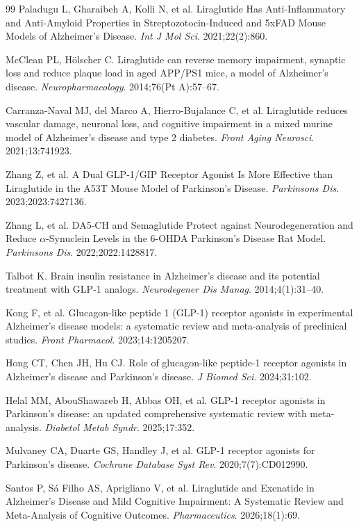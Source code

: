 \documentclass[11pt, a4paper]{article}
\begin{document}
\begin{thebibliography}{99}
 Paladugu L, Gharaibeh A, Kolli N, et al. Liraglutide
Has Anti-Inflammatory and Anti-Amyloid Properties in Streptozotocin-Induced
and 5xFAD Mouse Models of Alzheimer's Disease. \textit{Int J Mol Sci}.
2021;22(2):860.

 McClean PL, H\"olscher C. Liraglutide can reverse
memory impairment, synaptic loss and reduce plaque load in aged APP/PS1
mice, a model of Alzheimer's disease. \textit{Neuropharmacology}.
2014;76(Pt A):57--67.

 Carranza-Naval MJ, del Marco A, Hierro-Bujalance C,
et al. Liraglutide reduces vascular damage, neuronal loss, and cognitive
impairment in a mixed murine model of Alzheimer's disease and type 2
diabetes. \textit{Front Aging Neurosci}. 2021;13:741923.

 Zhang Z, et al. A Dual GLP-1/GIP Receptor Agonist Is
More Effective than Liraglutide in the A53T Mouse Model of Parkinson's
Disease. \textit{Parkinsons Dis}. 2023;2023:7427136.

 Zhang L, et al. DA5-CH and Semaglutide Protect against
Neurodegeneration and Reduce $\alpha$-Synuclein Levels in the 6-OHDA
Parkinson's Disease Rat Model. \textit{Parkinsons Dis}. 2022;2022:1428817.

 Talbot K. Brain insulin resistance in Alzheimer's
disease and its potential treatment with GLP-1 analogs. \textit{Neurodegener
Dis Manag}. 2014;4(1):31--40.

 Kong F, et al. Glucagon-like peptide 1 (GLP-1) receptor
agonists in experimental Alzheimer's disease models: a systematic review and
meta-analysis of preclinical studies. \textit{Front Pharmacol}.
2023;14:1205207.

 Hong CT, Chen JH, Hu CJ. Role of glucagon-like
peptide-1 receptor agonists in Alzheimer's disease and Parkinson's disease.
\textit{J Biomed Sci}. 2024;31:102.

 Helal MM, AbouShawareb H, Abbas OH, et al. GLP-1
receptor agonists in Parkinson's disease: an updated comprehensive
systematic review with meta-analysis. \textit{Diabetol Metab Syndr}.
2025;17:352.

 Mulvaney CA, Duarte GS, Handley J, et al. GLP-1
receptor agonists for Parkinson's disease. \textit{Cochrane Database Syst
Rev}. 2020;7(7):CD012990.

 Santos P, S\'a Filho AS, Aprigliano V, et al.
Liraglutide and Exenatide in Alzheimer's Disease and Mild Cognitive
Impairment: A Systematic Review and Meta-Analysis of Cognitive Outcomes.
\textit{Pharmaceutics}. 2026;18(1):69.


\end{thebibliography}
\end{document}
